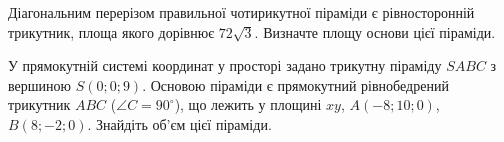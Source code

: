 \documentclass[12pt]{article}
\begin{document}
\begin{samepage}
\noindent\zadnum Діагональним перерізом правильної чотирикутної піраміди є рівносторонній трикутник, площа якого дорівнює $72\sqrt{3}$. Визначте площу основи цієї піраміди. 

\nmtnobreak
\nopagebreak\nbvspace{0.5cm}
\nmtAnswerBox
\par{}
\end{samepage}

\begin{samepage}
\noindent
\begin{minipage}[c]{0.56\textwidth}
\zadnum У прямокутній системі координат у просторі задано трикутну піраміду $SABC$ з вершиною $S(0; 0; 9)$. Основою піраміди є прямокутний рівнобедрений трикутник $ABC$ ($\angle C = 90^\circ$), що лежить у площині $xy$, $A(-8; 10; 0)$, $B(8; -2; 0)$. Знайдіть об’єм цієї піраміди. 
\end{minipage}%
\hfill
\begin{minipage}[c]{0.40\textwidth}
\centering
\begin{nmtfit}\end{nmtfit}
\end{minipage}
\par\nbvspace{0.2cm}
\nmtAnswerBox
\par{}
\end{samepage}
\end{document}
